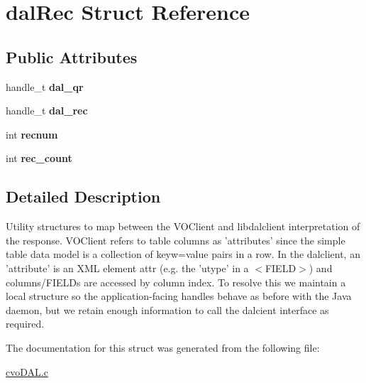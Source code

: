 \hypertarget{structdalRec}{
\section{dalRec Struct Reference}
\label{structdalRec}
}
\subsection*{Public Attributes}
\begin{CompactItemize}
\item 
\hypertarget{structdalRec_e4ff235533ffb8d6dade7432bd5026c6}{
handle\_\-t \textbf{dal\_\-qr}}
\label{structdalRec_e4ff235533ffb8d6dade7432bd5026c6}

\item 
\hypertarget{structdalRec_4b5254599dbf17b05b887b88f67f7668}{
handle\_\-t \textbf{dal\_\-rec}}
\label{structdalRec_4b5254599dbf17b05b887b88f67f7668}

\item 
\hypertarget{structdalRec_c27c4df9a0c264f8a1d90a9c356eee96}{
int \textbf{recnum}}
\label{structdalRec_c27c4df9a0c264f8a1d90a9c356eee96}

\item 
\hypertarget{structdalRec_47d4b35b727086612d0adce793f1268f}{
int \textbf{rec\_\-count}}
\label{structdalRec_47d4b35b727086612d0adce793f1268f}

\end{CompactItemize}


\subsection{Detailed Description}
Utility structures to map between the VOClient and libdalclient interpretation of the response. VOClient refers to table columns as 'attributes' since the simple table data model is a collection of keyw=value pairs in a row. In the dalclient, an 'attribute' is an XML element attr (e.g. the 'utype' in a $<$FIELD$>$) and columns/FIELDs are accessed by column index. To resolve this we maintain a local structure so the application-facing handles behave as before with the Java daemon, but we retain enough information to call the dalcient interface as required. 

The documentation for this struct was generated from the following file:\begin{CompactItemize}
\item 
\hyperlink{cvoDAL_8c}{cvoDAL.c}\end{CompactItemize}
